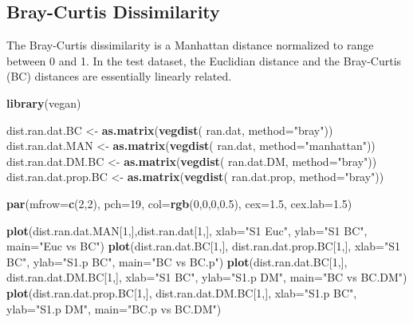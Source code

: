 \documentclass[twocolumn]{article}
\newenvironment{Shaded}{\begin{snugshade}}{\end{snugshade}}
\newcommand{\KeywordTok}[1]{\textcolor[rgb]{0.13,0.29,0.53}{\textbf{{#1}}}}
\newcommand{\DataTypeTok}[1]{\textcolor[rgb]{0.13,0.29,0.53}{{#1}}}
\newcommand{\DecValTok}[1]{\textcolor[rgb]{0.00,0.00,0.81}{{#1}}}
\newcommand{\FloatTok}[1]{\textcolor[rgb]{0.00,0.00,0.81}{{#1}}}
\newcommand{\StringTok}[1]{\textcolor[rgb]{0.31,0.60,0.02}{{#1}}}
\newcommand{\NormalTok}[1]{{#1}}
\begin{document}
\subsection{Bray-Curtis Dissimilarity}

The Bray-Curtis dissimilarity is a Manhattan distance normalized to
range between 0 and 1. In the test dataset, the Euclidian distance and
the Bray-Curtis (BC) distances are essentially linearly related.

\begin{Shaded}
\begin{Highlighting}[]
\KeywordTok{library}\NormalTok{(vegan)}

\NormalTok{dist.ran.dat.BC <-}\StringTok{ }\KeywordTok{as.matrix}\NormalTok{(}\KeywordTok{vegdist}\NormalTok{(}
    \NormalTok{ran.dat, }\DataTypeTok{method=}\StringTok{"bray"}\NormalTok{))}
\NormalTok{dist.ran.dat.MAN <-}\StringTok{ }\KeywordTok{as.matrix}\NormalTok{(}\KeywordTok{vegdist}\NormalTok{(}
    \NormalTok{ran.dat, }\DataTypeTok{method=}\StringTok{"manhattan"}\NormalTok{))}
\NormalTok{dist.ran.dat.DM.BC <-}\StringTok{ }\KeywordTok{as.matrix}\NormalTok{(}\KeywordTok{vegdist}\NormalTok{(}
    \NormalTok{ran.dat.DM, }\DataTypeTok{method=}\StringTok{"bray"}\NormalTok{))}
\NormalTok{dist.ran.dat.prop.BC <-}\StringTok{ }\KeywordTok{as.matrix}\NormalTok{(}\KeywordTok{vegdist}\NormalTok{(}
    \NormalTok{ran.dat.prop, }\DataTypeTok{method=}\StringTok{"bray"}\NormalTok{))}

\KeywordTok{par}\NormalTok{(}\DataTypeTok{mfrow=}\KeywordTok{c}\NormalTok{(}\DecValTok{2}\NormalTok{,}\DecValTok{2}\NormalTok{), }\DataTypeTok{pch=}\DecValTok{19}\NormalTok{, }\DataTypeTok{col=}\KeywordTok{rgb}\NormalTok{(}\DecValTok{0}\NormalTok{,}\DecValTok{0}\NormalTok{,}\DecValTok{0}\NormalTok{,}\FloatTok{0.5}\NormalTok{),}
    \DataTypeTok{cex=}\FloatTok{1.5}\NormalTok{, }\DataTypeTok{cex.lab=}\FloatTok{1.5}\NormalTok{)}

\KeywordTok{plot}\NormalTok{(dist.ran.dat.MAN[}\DecValTok{1}\NormalTok{,],dist.ran.dat[}\DecValTok{1}\NormalTok{,],}
    \DataTypeTok{xlab=}\StringTok{"S1 Euc"}\NormalTok{, }\DataTypeTok{ylab=}\StringTok{"S1 BC"}\NormalTok{,}
    \DataTypeTok{main=}\StringTok{"Euc vs BC"}\NormalTok{)}
\KeywordTok{plot}\NormalTok{(dist.ran.dat.BC[}\DecValTok{1}\NormalTok{,], dist.ran.dat.prop.BC[}\DecValTok{1}\NormalTok{,],}
    \DataTypeTok{xlab=}\StringTok{"S1 BC"}\NormalTok{, }\DataTypeTok{ylab=}\StringTok{"S1.p BC"}\NormalTok{,}
    \DataTypeTok{main=}\StringTok{"BC vs BC.p"}\NormalTok{)}
\KeywordTok{plot}\NormalTok{(dist.ran.dat.BC[}\DecValTok{1}\NormalTok{,], dist.ran.dat.DM.BC[}\DecValTok{1}\NormalTok{,],}
    \DataTypeTok{xlab=}\StringTok{"S1 BC"}\NormalTok{, }\DataTypeTok{ylab=}\StringTok{"S1.p DM"}\NormalTok{,}
    \DataTypeTok{main=}\StringTok{"BC vs BC.DM"}\NormalTok{)}
\KeywordTok{plot}\NormalTok{(dist.ran.dat.prop.BC[}\DecValTok{1}\NormalTok{,], dist.ran.dat.DM.BC[}\DecValTok{1}\NormalTok{,],}
    \DataTypeTok{xlab=}\StringTok{"S1.p BC"}\NormalTok{, }\DataTypeTok{ylab=}\StringTok{"S1.p DM"}\NormalTok{,}
    \DataTypeTok{main=}\StringTok{"BC.p vs BC.DM"}\NormalTok{)}
\end{Highlighting}
\end{Shaded}
\end{document}
